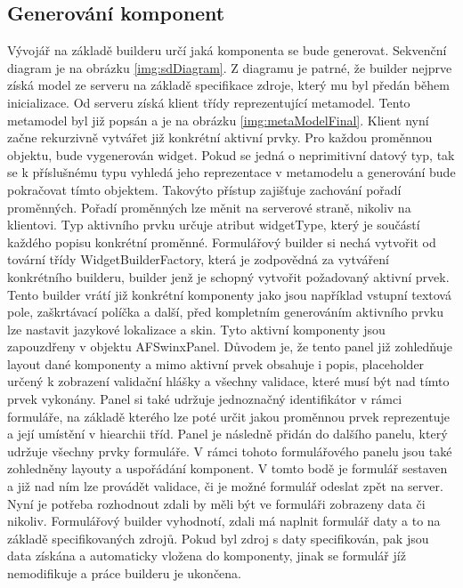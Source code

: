 \subsection{Generování komponent}
Vývojář na základě builderu určí jaká komponenta se bude generovat. Sekvenční diagram je na obrázku \ref{img:sdDiagram}. Z diagramu je patrné, že builder nejprve získá model ze serveru na základě specifikace zdroje, který mu byl předán během inicializace. Od serveru získá klient třídy reprezentující metamodel. Tento metamodel byl již popsán a je na obrázku \ref{img:metaModelFinal}. Klient nyní začne rekurzivně vytvářet již konkrétní aktivní prvky. Pro každou proměnnou objektu, bude vygenerován widget. Pokud se jedná o neprimitivní datový typ, tak se k příslušnému typu vyhledá jeho reprezentace v metamodelu a generování bude pokračovat tímto objektem. Takovýto přístup zajišťuje zachování pořadí proměnných. Pořadí proměnných lze měnit na serverové straně, nikoliv na klientovi. Typ aktivního prvku určuje atribut widgetType, který je součástí každého popisu konkrétní proměnné. Formulářový builder si nechá vytvořit od tovární třídy WidgetBuilderFactory, která je zodpovědná za vytváření konkrétního builderu, builder jenž je schopný vytvořit požadovaný aktivní prvek. Tento builder vrátí již konkrétní komponenty jako jsou například vstupní textová pole, zaškrtávací políčka a další, před kompletním generováním aktivního prvku lze nastavit jazykové lokalizace a skin. Tyto aktivní komponenty jsou zapouzdřeny v objektu AFSwinxPanel. Důvodem je, že tento panel již zohledňuje layout dané komponenty a mimo aktivní prvek obsahuje i popis, placeholder určený k zobrazení validační hlášky a všechny validace, které musí být nad tímto prvek vykonány. Panel si také udržuje jednoznačný identifikátor v rámci formuláře, na základě kterého lze poté určit jakou proměnnou prvek reprezentuje a její umístění v hiearchii tříd. Panel je následně přidán do dalšího panelu, který udržuje všechny prvky formuláře. V rámci tohoto formulářového panelu jsou také zohledněny layouty a uspořádání komponent. V tomto bodě je formulář sestaven a již nad ním lze provádět validace, či je možné formulář odeslat zpět na server. Nyní je potřeba rozhodnout zdali by měli být ve formuláři zobrazeny data či nikoliv. Formulářový builder vyhodnotí, zdali má naplnit formulář daty a to na základě specifikovaných zdrojů. Pokud byl zdroj s daty specifikován, pak jsou data získána a automaticky vložena do komponenty, jinak se formulář jíž nemodifikuje a práce builderu je ukončena.

